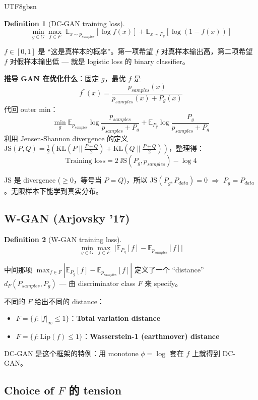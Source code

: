 \documentclass[11pt]{article}
\newtheorem{definition}{Definition}[section]
\begin{document}
\begin{CJK}{UTF8}{gbsn}
\begin{definition}[DC-GAN training loss]
\[
  \min_{g \in G} \max_{f \in F}\; \mathbb{E}_{x \sim p_{samples}}[\log f(x)] + \mathbb{E}_{x \sim P_g}[\log(1 - f(x))]
\]
\end{definition}

$f \in [0, 1]$ 是 ``这是真样本的概率''。第一项希望 $f$ 对真样本输出高，第二项希望 $f$ 对假样本输出低 --- 就是 logistic loss 的 binary classifier。

\textbf{推导 GAN 在优化什么}：固定 $g$，最优 $f$ 是
\[
  f^*(x) = \frac{p_{samples}(x)}{p_{samples}(x) + P_g(x)}
\]
代回 outer min：
\[
  \min_g \mathbb{E}_{p_{samples}} \log \frac{p_{samples}}{p_{samples} + P_g} + \mathbb{E}_{P_g} \log \frac{P_g}{p_{samples} + P_g}
\]
利用 Jensen-Shannon divergence 的定义 $\mathrm{JS}(P, Q) = \frac{1}{2}(\mathrm{KL}(P \| \frac{P+Q}{2}) + \mathrm{KL}(Q \| \frac{P+Q}{2}))$，整理得：
\[
  \boxed{\text{Training loss} = 2\,\mathrm{JS}(P_g, p_{samples}) - \log 4}
\]

JS 是 divergence ($\geq 0$，等号当 $P = Q$)，所以 JS$(P_g, P_{data}) = 0$ $\Rightarrow$ $P_g = P_{data}$。无限样本下能学到真实分布。

\subsection{W-GAN (Arjovsky '17)}

\begin{definition}[W-GAN training loss]
\[
  \min_{g \in G} \max_{f \in F}\; \big|\mathbb{E}_{P_g}[f] - \mathbb{E}_{p_{samples}}[f]\big|
\]
\end{definition}

中间那项 $\max_{f \in F}|\mathbb{E}_{P_g}[f] - \mathbb{E}_{p_{samples}}[f]|$ 定义了一个 ``distance'' $d_F(P_{samples}, P_g)$ --- 由 discriminator class $F$ 来 specify。

不同的 $F$ 给出不同的 distance：
\begin{itemize}
  \item $F = \{f : |f|_\infty \leq 1\}$：\textbf{Total variation distance}
  \item $F = \{f : \mathrm{Lip}(f) \leq 1\}$：\textbf{Wasserstein-1 (earthmover) distance}
\end{itemize}

DC-GAN 是这个框架的特例：用 monotone $\phi = \log$ 套在 $f$ 上就得到 DC-GAN。

\subsection{Choice of $F$ 的 tension}


\end{CJK}
\end{document}
